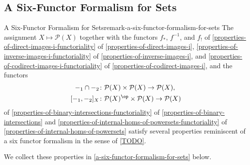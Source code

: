 \subsection{A Six-Functor Formalism for Sets}\label{subsection-a-six-functor-formalism-for-sets}
\begin{remark}{A Six-Functor Formalism for Sets}{remark-a-six-functor-formalism-for-sets}%
    The assignment $X\mapsto\mathcal{P}(X)$ together with the functors $f_{*}$, $f^{-1}$, and $f_{!}$ of \cref{properties-of-direct-images-i-functoriality} of \cref{properties-of-direct-images-i}, \cref{properties-of-inverse-images-i-functoriality} of \cref{properties-of-inverse-images-i}, and \cref{properties-of-codirect-images-i-functoriality} of \cref{properties-of-codirect-images-i}, and the functors
    \begin{align*}
        -_{1}\cap-_{2}    &\colon \mathcal{P}(X)\times\mathcal{P}(X) \to \mathcal{P}(X),\\
        [-_{1},-_{2}]_{X} &\colon \mathcal{P}(X)^{\op}\times\mathcal{P}(X) \to \mathcal{P}(X)
    \end{align*}
    of \cref{properties-of-binary-intersections-functoriality} of \cref{properties-of-binary-intersections} and \cref{properties-of-internal-homs-of-powersets-functoriality} of \cref{properties-of-internal-homs-of-powersets} satisfy several properties reminiscent of a six functor formalism in the sense of \cref{TODO}.

    \indent We collect these properties in \cref{a-six-functor-formalism-for-sets} below.
\end{remark}
